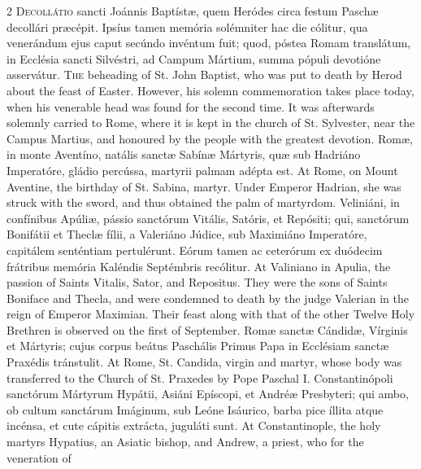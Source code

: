 \begin{paracol}{2}
\lettrine[lines=2]{D}{ecollátio} sancti 
 Joánnis Baptístæ, quem Heródes circa festum Paschæ decollári præcépit. 
 Ipsíus tamen memória solémniter hac die cólitur, qua venerándum ejus caput 
 secúndo invéntum fuit; quod, póstea Romam translátum, in Ecclésia sancti 
 Silvéstri, ad Campum Mártium, summa pópuli devotióne asservátur.
\switchcolumn
{}
\lettrine[lines=2]{T}{he} beheading of St. John Baptist, 
 who was put to death by Herod about the feast of Easter. However, his 
 solemn commemoration takes place today, when his venerable head was found 
 for the second time. It was afterwards solemnly carried to Rome, where 
 it is kept in the church of St. Sylvester, near the Campus Martius, and 
 honoured by the people with the greatest devotion.
\switchcolumn*
{}
Romæ, in monte Aventíno, 
 natális sanctæ Sabínæ Mártyris, quæ sub Hadriáno Imperatóre, gládio percússa, 
 martyrii palmam adépta est.
\switchcolumn
{}
At Rome, on Mount Aventine, the 
 birthday of St. Sabina, martyr. Under Emperor Hadrian, she was struck 
 with the sword, and thus obtained the palm of martyrdom.
\switchcolumn*
{}
Veliniáni, in 
 confínibus Apúliæ, pássio sanctórum Vitális, Satóris, et Repósiti; qui, 
 sanctórum Bonifátii et Theclæ fílii, a Valeriáno Júdice, sub Maximiáno 
 Imperatóre, capitálem senténtiam pertulérunt. Eórum tamen ac ceterórum 
 ex duódecim frátribus memória Kaléndis Septémbris recólitur.
\switchcolumn
{}
At Valiniano in Apulia, the passion 
 of Saints Vitalis, Sator, and Repositus. They were the sons of Saints 
 Boniface and Thecla, and were condemned to death by the judge Valerian in 
 the reign of Emperor Maximian. Their feast along with that of the 
 other Twelve Holy Brethren is observed on the first of September.
\switchcolumn*
{}
Romæ sanctæ Cándidæ, 
 Vírginis et Mártyris; cujus corpus beátus Paschális Primus Papa in Ecclésiam 
 sanctæ Praxédis tránstulit.
\switchcolumn
{}
At Rome, St. Candida, virgin and 
 martyr, whose body was transferred to the Church of St. Praxedes by Pope 
 Paschal I.
\switchcolumn*
{}
Constantinópoli 
 sanctórum Mártyrum Hypátii, Asiáni Epíscopi, et Andréæ Presbyteri; qui ambo, 
 ob cultum sanctárum Imáginum, sub Leóne Isáurico, barba pice íllita atque 
 incénsa, et cute cápitis extrácta, juguláti sunt.
\switchcolumn
{}
At Constantinople, the holy martyrs 
 Hypatius, an Asiatic bishop, and Andrew, a priest, who for the veneration of 

\end{paracol}
